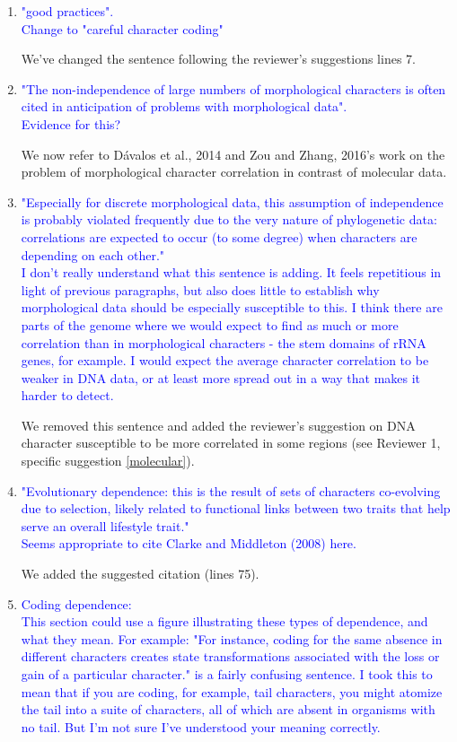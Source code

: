 \documentclass[12pt,letterpaper]{article}
\begin{document}
\begin{enumerate}
\item{\textcolor{blue}{"good practices".\\
Change to "careful character coding"}}

We've changed the sentence following the reviewer's suggestions lines 7.

\item{\textcolor{blue}{"The non-independence of large numbers of morphological characters is often cited in anticipation of problems with morphological data".\\
Evidence for this?}}

We now refer to D\'{a}valos et al., 2014 and Zou and Zhang, 2016's work on the problem of morphological character correlation in contrast of molecular data.

\item{\textcolor{blue}{"Especially for discrete morphological data, this assumption of independence is probably violated frequently due to the very nature of phylogenetic data: correlations are expected to occur (to some degree) when characters are depending on each other."\\
I don't really understand what this sentence is adding. It feels repetitious in light of previous paragraphs, but also does little to establish why morphological data should be especially susceptible to this. I think there are parts of the genome where we would expect to find as much or more correlation than in morphological characters - the stem domains of rRNA genes, for example. I would expect the average character correlation to be weaker in DNA data, or at least more spread out in a way that makes it harder to detect.}}

We removed this sentence and added the reviewer's suggestion on DNA character susceptible to be more correlated in some regions (see Reviewer 1, specific suggestion \ref{molecular}).

\item{\textcolor{blue}{"Evolutionary dependence: this is the result of sets of characters co-evolving due to selection, likely related to functional links between two traits that help serve an overall lifestyle trait."\\
Seems appropriate to cite Clarke and Middleton (2008) here.}}

We added the suggested citation (lines 75).

\item{\textcolor{blue}{Coding dependence:\\
This section could use a figure illustrating these types of dependence, and what they mean. For example: "For instance, coding for the same absence in different characters creates state transformations associated with the loss or gain of a particular character." is a fairly confusing sentence. I took this to mean that if you are coding, for example, tail characters, you might atomize the tail into a suite of characters, all of which are absent in organisms with no tail. But I'm not sure I've understood your meaning correctly.}}


\end{enumerate}
\end{document}
